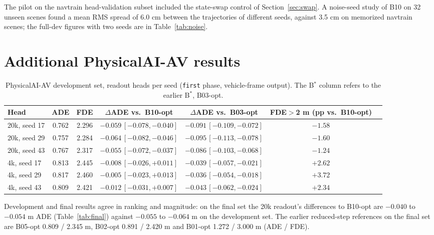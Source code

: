 \documentclass[10pt]{article}
\newcommand{\Bstar}{B$^{*}$}
\newcommand{\first}{\texttt{first}}
\begin{document}
The pilot on the navtrain head-validation subset included the state-swap control of Section~\ref{sec:swap}. A noise-seed study of B10 on 32 unseen scenes found a mean RMS spread of 6.0 cm between the trajectories of different seeds, against 3.5 cm on memorized navtrain scenes; the full-dev figures with two seeds are in Table~\ref{tab:noise}.

\section{Additional PhysicalAI-AV results}
\label{app:pai-dev}

\begin{table}[H]
\caption{PhysicalAI-AV development set, readout heads per seed (\first{} phase, vehicle-frame output). The \Bstar{} column refers to the earlier \Bstar{}, B03-opt.}
\begin{center}
\footnotesize
\setlength{\tabcolsep}{4pt}
\begin{tabular}{lcccccc}
\toprule
Head & ADE & FDE & $\Delta$ADE vs.\ B10-opt & $\Delta$ADE vs.\ B03-opt & FDE$>$2 m (pp vs.\ B10-opt) \\
\midrule
20k, seed 17 & 0.762 & 2.296 & $-0.059\,[-0.078,-0.040]$ & $-0.091\,[-0.109,-0.072]$ & $-1.58$ \\
20k, seed 29 & 0.757 & 2.284 & $-0.064\,[-0.082,-0.046]$ & $-0.095\,[-0.113,-0.078]$ & $-1.60$ \\
20k, seed 43 & 0.767 & 2.317 & $-0.055\,[-0.072,-0.037]$ & $-0.086\,[-0.103,-0.068]$ & $-1.24$ \\
4k, seed 17 & 0.813 & 2.445 & $-0.008\,[-0.026,+0.011]$ & $-0.039\,[-0.057,-0.021]$ & $+2.62$ \\
4k, seed 29 & 0.817 & 2.460 & $-0.005\,[-0.023,+0.013]$ & $-0.036\,[-0.054,-0.018]$ & $+3.72$ \\
4k, seed 43 & 0.809 & 2.421 & $-0.012\,[-0.031,+0.007]$ & $-0.043\,[-0.062,-0.024]$ & $+2.34$ \\
\bottomrule
\end{tabular}
\end{center}
\end{table}

Development and final results agree in ranking and magnitude: on the final set the 20k readout's differences to B10-opt are $-0.040$ to $-0.054$ m ADE (Table~\ref{tab:final}) against $-0.055$ to $-0.064$ m on the development set. The earlier reduced-step references on the final set are B05-opt 0.809 / 2.345 m, B02-opt 0.891 / 2.420 m and B01-opt 1.272 / 3.000 m (ADE / FDE).
\end{document}
